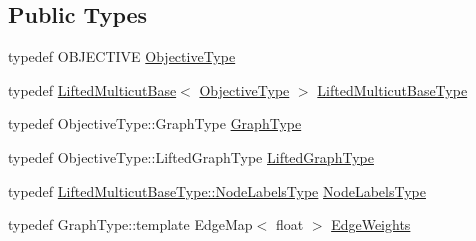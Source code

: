 \subsection*{Public Types}
\begin{DoxyCompactItemize}
\item 
typedef O\+B\+J\+E\+C\+T\+I\+VE \hyperlink{classnifty_1_1graph_1_1opt_1_1lifted__multicut_1_1WatershedProposalGenerator_a78cd96503ad62ae011fe42ff87692984}{Objective\+Type}
\item 
typedef \hyperlink{classnifty_1_1graph_1_1opt_1_1lifted__multicut_1_1LiftedMulticutBase}{Lifted\+Multicut\+Base}$<$ \hyperlink{classnifty_1_1graph_1_1opt_1_1lifted__multicut_1_1WatershedProposalGenerator_a78cd96503ad62ae011fe42ff87692984}{Objective\+Type} $>$ \hyperlink{classnifty_1_1graph_1_1opt_1_1lifted__multicut_1_1WatershedProposalGenerator_a460665fa00de2fd73bacf92a534e454d}{Lifted\+Multicut\+Base\+Type}
\item 
typedef Objective\+Type\+::\+Graph\+Type \hyperlink{classnifty_1_1graph_1_1opt_1_1lifted__multicut_1_1WatershedProposalGenerator_a8f88bbf08b2852d8f307fe08583ae85c}{Graph\+Type}
\item 
typedef Objective\+Type\+::\+Lifted\+Graph\+Type \hyperlink{classnifty_1_1graph_1_1opt_1_1lifted__multicut_1_1WatershedProposalGenerator_af8185539cbaecdb1701e2219370b2d8d}{Lifted\+Graph\+Type}
\item 
typedef \hyperlink{classnifty_1_1graph_1_1opt_1_1common_1_1SolverBase_abefd51561de2fd009f6bed6bef6009ea}{Lifted\+Multicut\+Base\+Type\+::\+Node\+Labels\+Type} \hyperlink{classnifty_1_1graph_1_1opt_1_1lifted__multicut_1_1WatershedProposalGenerator_a8739882eb9eef6b8d6fe1c37e8b31817}{Node\+Labels\+Type}
\item 
typedef Graph\+Type\+::template Edge\+Map$<$ float $>$ \hyperlink{classnifty_1_1graph_1_1opt_1_1lifted__multicut_1_1WatershedProposalGenerator_a882f04870e771062ec0c56e660830077}{Edge\+Weights}
\end{DoxyCompactItemize}
